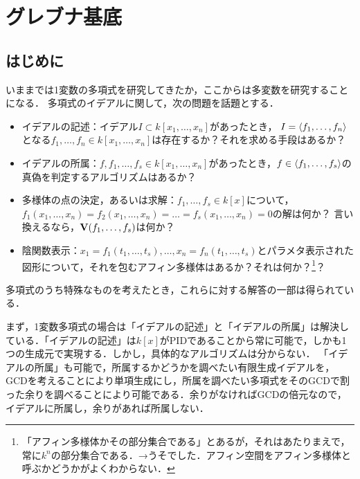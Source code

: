 \documentclass[9pt]{ltjsarticle}
\begin{document}
\section{グレブナ基底}
\subsection{はじめに}
いままでは1変数の多項式を研究してきたか，ここからは多変数を研究することになる．
多項式のイデアルに関して，次の問題を話題とする．
\begin{itemize}
 \item イデアルの記述：イデアル$I\subset k[x_1,\dots,x_n]$があったとき，
$I=\left\langle f_1,\dots,f_n \right\rangle$となる$f_1,\dots,f_n \in k[x_1,\dots,x_n]$は存在するか？それを求める手段はあるか？
 \item イデアルの所属：$f,f_1,\dots,f_s \in k[x_1,\dots,x_n]$があったとき，$f\in \left\langle f_1,\dots,f_s \right\rangle$の真偽を判定するアルゴリズムはあるか？
 \item 多様体の点の決定，あるいは求解：$f_1,\dots,f_s \in k[x]$について，
$f_1(x_1,\dots,x_n)=f_2(x_1,\dots,x_n)=\dots =f_s(x_1,\dots,x_n)=0$の解は何か？
言い換えるなら，$\textbf V(f_1,\dots,f_s)$は何か？
 \item 陰関数表示：$x_1 = f_1(t_1,\dots,t_s),\dots,x_n=f_n(t_1,\dots,t_s)$とパラメタ表示された図形について，それを包むアフィン多様体はあるか？それは何か？\footnote{「アフィン多様体かその部分集合である」とあるが，それはあたりまえで，常に$k^n$の部分集合である．→うそでした．アフィン空間をアフィン多様体と呼ぶかどうかがよくわからない．}？
\end{itemize}

多項式のうち特殊なものを考えたとき，これらに対する解答の一部は得られている．

まず，1変数多項式の場合は「イデアルの記述」と「イデアルの所属」は解決している．「イデアルの記述」は$k[x]$がPIDであることから常に可能で，しかも1つの生成元で実現する．しかし，具体的なアルゴリズムは分からない．
「イデアルの所属」も可能で，所属するかどうかを調べたい有限生成イデアルを，GCDを考えることにより単項生成にし，所属を調べたい多項式をそのGCDで割った余りを調べることにより可能である．余りがなければGCDの倍元なので，イデアルに所属し，余りがあれば所属しない．
\end{document}
